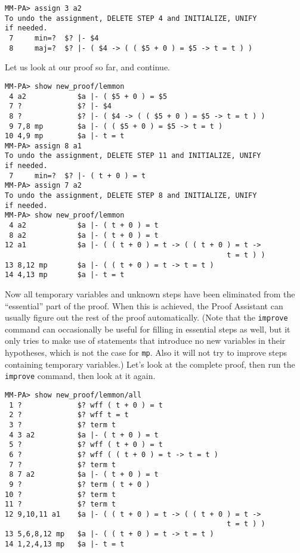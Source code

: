 \begin{verbatim}
MM-PA> assign 3 a2
To undo the assignment, DELETE STEP 4 and INITIALIZE, UNIFY
if needed.
 7     min=?  $? |- $4
 8     maj=?  $? |- ( $4 -> ( ( $5 + 0 ) = $5 -> t = t ) )
\end{verbatim}

Let us look at our proof so far, and continue.

\begin{verbatim}
MM-PA> show new_proof/lemmon
 4 a2            $a |- ( $5 + 0 ) = $5
 7 ?             $? |- $4
 8 ?             $? |- ( $4 -> ( ( $5 + 0 ) = $5 -> t = t ) )
 9 7,8 mp        $a |- ( ( $5 + 0 ) = $5 -> t = t )
10 4,9 mp        $a |- t = t
MM-PA> assign 8 a1
To undo the assignment, DELETE STEP 11 and INITIALIZE, UNIFY
if needed.
 7     min=?  $? |- ( t + 0 ) = t
MM-PA> assign 7 a2
To undo the assignment, DELETE STEP 8 and INITIALIZE, UNIFY
if needed.
MM-PA> show new_proof/lemmon
 4 a2            $a |- ( t + 0 ) = t
 8 a2            $a |- ( t + 0 ) = t
12 a1            $a |- ( ( t + 0 ) = t -> ( ( t + 0 ) = t ->
                                                    t = t ) )
13 8,12 mp       $a |- ( ( t + 0 ) = t -> t = t )
14 4,13 mp       $a |- t = t
\end{verbatim}

Now all temporary variables and unknown steps have been eliminated from the
``essential'' part of the proof.  When this is achieved, the Proof
Assistant can usually figure out the rest of the proof
automatically.  (Note that the \texttt{improve} command can occasionally be
useful for filling in essential steps as well, but it only tries to make use
of statements that introduce no new variables in their hypotheses, which is
not the case for \texttt{mp}. Also it will not try to improve steps containing
temporary variables.)  Let's look at the complete proof, then run
the \texttt{improve} command, then look at it again.

\begin{verbatim}
MM-PA> show new_proof/lemmon/all
 1 ?             $? wff ( t + 0 ) = t
 2 ?             $? wff t = t
 3 ?             $? term t
 4 3 a2          $a |- ( t + 0 ) = t
 5 ?             $? wff ( t + 0 ) = t
 6 ?             $? wff ( ( t + 0 ) = t -> t = t )
 7 ?             $? term t
 8 7 a2          $a |- ( t + 0 ) = t
 9 ?             $? term ( t + 0 )
10 ?             $? term t
11 ?             $? term t
12 9,10,11 a1    $a |- ( ( t + 0 ) = t -> ( ( t + 0 ) = t ->
                                                    t = t ) )
13 5,6,8,12 mp   $a |- ( ( t + 0 ) = t -> t = t )
14 1,2,4,13 mp   $a |- t = t
\end{verbatim}

